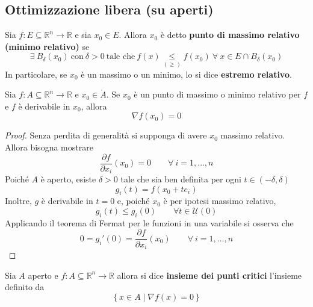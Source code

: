 \subsection{Ottimizzazione libera (su aperti)}
\begin{definition} \label{Def: Max e min relativo}
    Sia $f:E \subseteq \mathbb{R}^n \to \mathbb{R}$ e sia $x_0 \in E$. Allora $x_0$ è detto \textbf{punto di massimo relativo (minimo relativo)} se
    \begin{equation}
        \exists\ B_\delta(x_0)\ \text{con}\ \delta>0\ \text{tale che}\ f(x) \underset{(\geq)}{\leq} f(x_0)\ \forall\ x \in E \cap B_\delta(x_0)
    \end{equation}
    In particolare, se $x_0$ è un massimo o un minimo, lo si dice \textbf{estremo relativo}.
\end{definition}
\begin{theorem}
Sia $f:A \subseteq \mathbb{R}^n  \to \mathbb{R}$ e $x_0 \in \mathring{A}$. Se $x_0$ è un punto di massimo o minimo relativo per $f$ e $f$ è derivabile in $x_0$, allora
\begin{equation}
    \nabla f(x_0)=0
\end{equation}
\end{theorem}
\begin{proof}
    Senza perdita di generalità si supponga di avere $x_0$ massimo relativo. Allora bisogna mostrare
    \begin{equation}
        \frac{\partial f}{\partial x_i}(x_0)=0 \qquad \forall\ i=1, \dots, n
    \end{equation}
    Poiché $A$ è aperto, esiste $\delta>0$ tale che sia ben definita per ogni $t \in (-\delta, \delta)$
    \begin{equation}
        g_i(t)=f(x_0+t e_i)
    \end{equation}
    Inoltre, $g$ è derivabile in $t=0$ e, poiché $x_0$ è per ipotesi massimo relativo, 
    \begin{equation}
        g_i(t) \leq g_i(0)\qquad\forall t \in \mathcal{U}(0)
    \end{equation}
    Applicando il teorema di Fermat per le funzioni in una variabile si osserva che
    \begin{equation}
        0=g_i'(0)=\frac{\partial f}{\partial x_i}(x_0)\qquad\forall\ i=1, \dots, n
    \end{equation}
\end{proof}
\begin{definition} \label{Def: Insieme dei punti critici}
    Sia $A$ aperto e $f: A \subseteq \mathbb{R}^n  \to \mathbb{R}$ allora si dice \textbf{insieme dei punti critici} l'insieme definito da
    \begin{equation}
        \left\{x\in A \mid \nabla f(x)=0\right\}
    \end{equation}
\end{definition}
